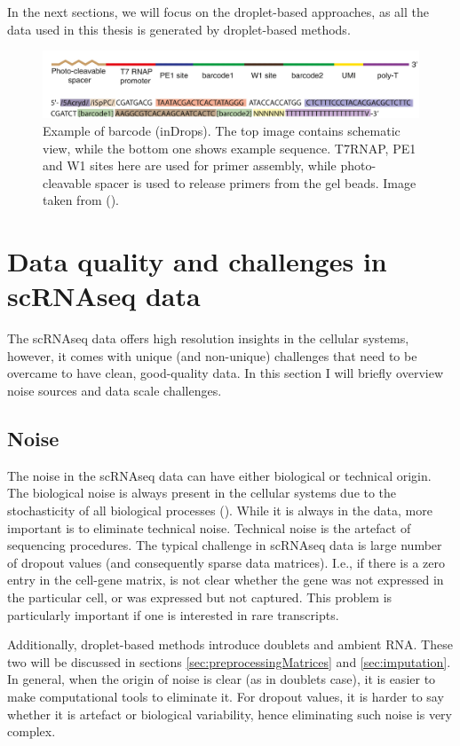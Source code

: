 In the next sections, we will focus on the droplet-based approaches,
as all the data used in this thesis is generated by droplet-based methods.

\begin{figure}
  \centering
  \includegraphics[width=\linewidth]{images/primer.png}
  \caption{Example of barcode (inDrops). The top image contains schematic view, while the bottom one shows example sequence.
           T7RNAP, PE1 and W1 sites here are used for primer assembly,
           while photo-cleavable spacer is used to release primers from the gel beads. Image taken from (\cite{Klein2015}).}
  \label{fig:primer}
\end{figure}

\section{Data quality and challenges in scRNAseq data}

The scRNAseq data offers high resolution insights in the cellular systems, however,
it comes with unique (and non-unique) challenges that need to be overcame to have clean, good-quality data.
In this section I will briefly overview noise sources and data scale challenges.

\subsection{Noise}

The noise in the scRNAseq data can have either biological or technical origin.
The biological noise is always present in the cellular systems due to the stochasticity of all biological processes (\cite{Vaz2017}).
While it is always in the data, more important is to eliminate technical noise.
Technical noise is the artefact of sequencing procedures.
The typical challenge in scRNAseq data is large number of dropout values (and consequently sparse data matrices).
I.e., if there is a zero entry in the cell-gene matrix, is not clear whether the gene was not expressed in the particular cell,
or was expressed but not captured.
This problem is particularly important if one is interested in rare transcripts.

Additionally, droplet-based methods introduce doublets and ambient RNA.
These two will be discussed in sections \ref{sec:preprocessingMatrices} and \ref{sec:imputation}.
In general, when the origin of noise is clear (as in doublets case), it is easier to make computational tools to eliminate it.
For dropout values, it is harder to say whether it is artefact or biological variability, hence eliminating such noise is very complex.

